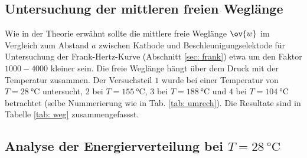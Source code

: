 \subsection{Untersuchung der mittleren freien Weglänge}
\FloatBarrier
Wie in der Theorie erwähnt sollte die mittlere freie Weglänge $\ov{w}$ im Vergleich zum
Abstand $a$ zwischen Kathode und Beschleunigungselektode für Untersuchung der Frank-Hertz-Kurve (Abschnitt \ref{sec: frank})
etwa um den Faktor $1000-4000$ kleiner sein. Die freie Weglänge hängt über dem Druck mit der Temperatur zusammen.
Der Versuchsteil $1$ wurde bei einer Temperatur von $T=\SI{28}{\celsius}$ untersucht, $2$ bei $T=\SI{155}{\celsius}$,
$3$ bei $T=\SI{188}{\celsius}$ und $4$ bei $T=\SI{104}{\celsius}$ betrachtet (selbe Nummerierung wie in Tab. \ref{tab: umrech}).
Die Resultate sind in Tabelle \ref{tab: weg} zusammengefassst.


\subsection{Analyse der Energierverteilung bei $T=\SI{28}{\celsius}$}


